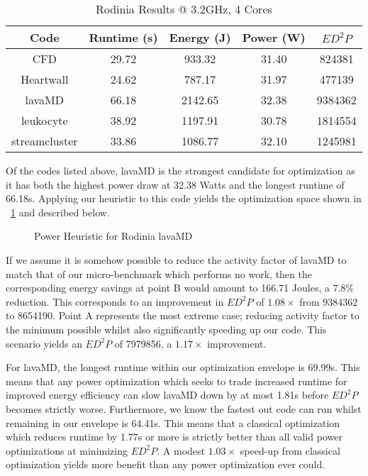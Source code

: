 \begin{table}
\centering
\small
\begin{tabular}{@{}ccccc@{}} \toprule
Code & Runtime (s) & Energy (J) & Power (W) & $ED^2P$ \\ \midrule 
CFD & 29.72 & 933.32 & 31.40 & 824381  \\ 
Heartwall & 24.62 & 787.17 & 31.97 & 477139 \\ 
lavaMD & 66.18 & 2142.65 & 32.38 & 9384362\\ 
leukocyte &  38.92 & 1197.91 & 30.78 & 1814554 \\ 
streamcluster & 33.86 & 1086.77 & 32.10 & 1245981 \\ 
\bottomrule
\end{tabular}
   \vspace{0.5\baselineskip}
\caption{Rodinia Results @ 3.2GHz, 4 Cores}
\label{tab:coderesults}
\end{table} 

Of the codes listed above, lavaMD is the strongest candidate for optimization as it has both the highest power draw at 32.38 Watts and the longest runtime of 66.18s. Applying our heuristic to this code yields the optimization space shown in \figurename~\ref{fig:lavamd} and described below.


\begin{figure}

\caption{Power Heuristic for Rodinia lavaMD} \label{fig:lavamd}
\end{figure}

If we assume it is somehow possible to reduce the activity factor of lavaMD to match that of our  micro-benchmark which performs no work, then the corresponding energy savings at point B would amount to 166.71 Joules, a $7.8\%$ reduction. This corresponds to an improvement in $ED^2P$ of $1.08\times$ from 9384362 to 8654190. Point A represents the most extreme case; reducing activity factor to the minimum possible whilst also significantly speeding up our code. This scenario yields an $ED^2P$ of 7979856, a $1.17\times$ improvement.

For lavaMD, the longest runtime within our optimization envelope is 69.99s. This means that any power optimization which seeks to trade increased runtime for improved energy efficiency can slow lavaMD down by at most 1.81s before $ED^2P$ becomes strictly worse. Furthermore, we know the fastest out code can run whilst remaining in our envelope is 64.41s. This means that a classical optimization which reduces runtime by 1.77s or more is strictly better than all valid power optimizations at minimizing $ED^2P$. A modest $1.03 \times$ speed-up from classical optimization yields more benefit than any power optimization ever could.


